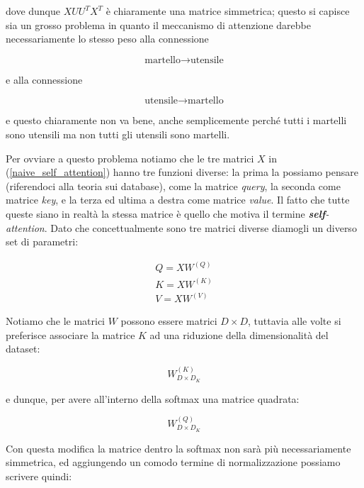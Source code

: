 dove dunque \(XUU^TX^T\) è chiaramente una matrice simmetrica; questo si capisce sia un grosso problema in quanto il meccanismo di attenzione darebbe necessariamente lo stesso peso alla connessione

\begin{equation}
    \text{martello} \to \text{utensile}
\end{equation}

e alla connessione

\begin{equation}
    \text{utensile} \to \text{martello}
\end{equation}

e questo chiaramente non va bene, anche semplicemente perché tutti i martelli sono utensili ma non tutti gli utensili sono martelli.

Per ovviare a questo problema notiamo che le tre matrici \(X\) in (\ref{naive_self_attention}) hanno tre funzioni diverse: la prima la possiamo pensare (riferendoci alla teoria sui database), come la matrice \textit{query}, la seconda come matrice \textit{key}, e la terza ed ultima a destra come matrice \textit{value}. Il fatto che tutte queste siano in realtà la stessa matrice è quello che motiva il termine \textit{\textbf{self}-attention}. Dato che concettualmente sono tre matrici diverse diamogli un diverso set di parametri:

\begin{align}
    Q = XW^{(Q)} \\
    K = XW^{(K)} \\
    V = XW^{(V)}
\end{align}

Notiamo che le matrici \(W\) possono essere matrici \(D \times D\), tuttavia alle volte si preferisce associare la matrice \(K\) ad una riduzione della dimensionalità del dataset:

\begin{equation}
    W^{(K)}_{D \times D_K}
\end{equation}

e dunque, per avere all'interno della softmax una matrice quadrata:

\begin{equation}
    W^{(Q)}_{D \times D_K}
\end{equation}

Con questa modifica la matrice dentro la softmax non sarà più necessariamente simmetrica, ed aggiungendo un comodo termine di normalizzazione possiamo scrivere quindi:

